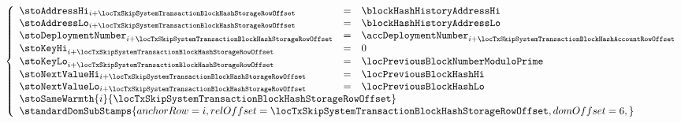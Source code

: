 \item[\underline{Storing the previous \inst{BLOCKHASH} in the state:}] 
	\[
		\left\{ \begin{array}{lclr}
			\stoAddressHi         _{i + \locTxSkipSystemTransactionBlockHashStorageRowOffset}  & = & \blockHashHistoryAddressHi                                                             \\
			\stoAddressLo         _{i + \locTxSkipSystemTransactionBlockHashStorageRowOffset}  & = & \blockHashHistoryAddressLo                                                             \\
			\stoDeploymentNumber  _{i + \locTxSkipSystemTransactionBlockHashStorageRowOffset}  & = & \accDeploymentNumber _{i + \locTxSkipSystemTransactionBlockHashAccountRowOffset} \\
			\stoKeyHi             _{i + \locTxSkipSystemTransactionBlockHashStorageRowOffset}  & = & 0                                                                                \\
			\stoKeyLo             _{i + \locTxSkipSystemTransactionBlockHashStorageRowOffset}  & = & \locPreviousBlockNumberModuloPrime                                               \\
			\stoNextValueHi       _{i + \locTxSkipSystemTransactionBlockHashStorageRowOffset}  & = & \locPreviousBlockHashHi                                               \\
			\stoNextValueLo       _{i + \locTxSkipSystemTransactionBlockHashStorageRowOffset}  & = & \locPreviousBlockHashLo                                               \\
			\multicolumn{3}{l}{\stoSameWarmth  {i}{\locTxSkipSystemTransactionBlockHashStorageRowOffset} } \\
			\multicolumn{3}{l}{
				\standardDomSubStamps {
					anchorRow = i                                                    ,
					relOffset = \locTxSkipSystemTransactionBlockHashStorageRowOffset ,
					domOffset = 6                                                    ,
				}} \\
		\end{array} \right.
	\]
